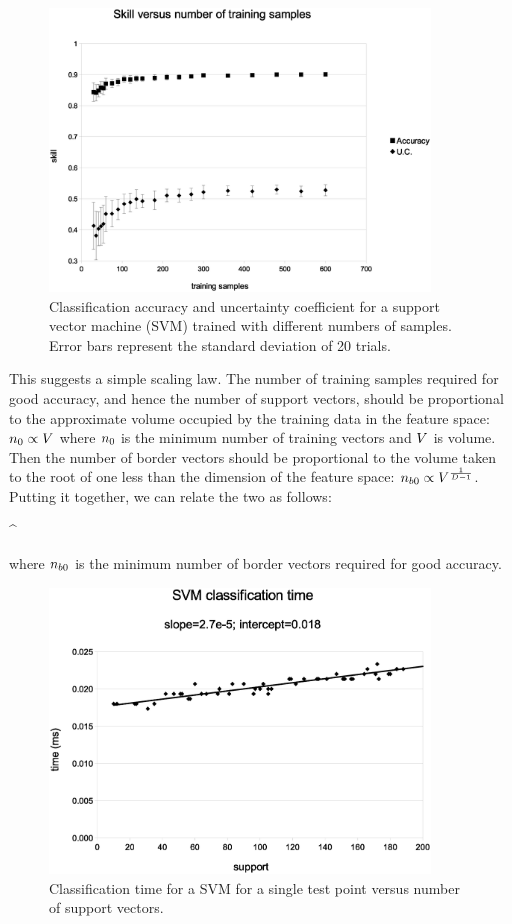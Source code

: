 \begin{figure}
\includegraphics[width=0.9\textwidth]{../skill_v_nt}
\caption{Classification accuracy and uncertainty coefficient for a support vector machine (SVM) trained with different numbers of samples.
Error bars represent the standard deviation of 20 trials.}
\label{skill_v_nt}
\end{figure}

This suggests a simple scaling law. The number of training samples required
for good accuracy, and hence the number of support vectors, 
should be proportional to the approximate volume occupied by the
training data in the feature space: $n_0 \propto V$ where 
$n_0$ is the minimum number of training vectors and $V$ is volume.
Then the number of border vectors should be proportional to the volume
taken to the root of one less than the dimension of the feature space:
$n_{b0} \propto V^\frac{1}{D-1}$.
Putting it together, we can relate the two as follows:
\begin{eqnnon}
	\minborders \propto \mintrain^
	\label{scaling_law}
\end{eqnnon}
where $n_{b0}$ is the minimum number of border vectors required for good
accuracy.

\begin{figure}
\includegraphics[width=0.9\textwidth]{../svm_time}
\caption{Classification time for a SVM for a single test point versus number of support vectors.}
\label{svm_time}
\end{figure}

